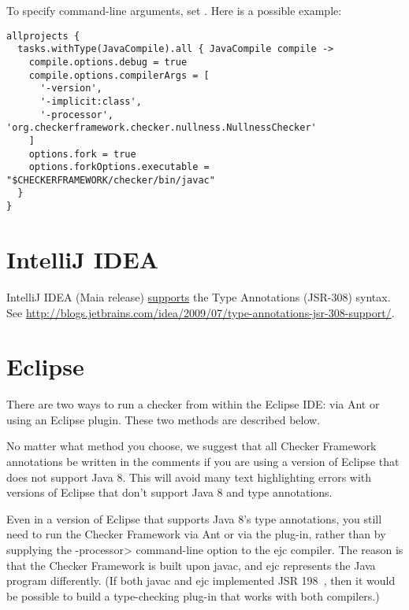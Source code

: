 To specify command-line arguments, set
.  Here is a possible example:

\begin{Verbatim}
allprojects {
  tasks.withType(JavaCompile).all { JavaCompile compile ->
    compile.options.debug = true
    compile.options.compilerArgs = [
      '-version',
      '-implicit:class',
      '-processor', 'org.checkerframework.checker.nullness.NullnessChecker'
    ]
    options.fork = true
    options.forkOptions.executable = "$CHECKERFRAMEWORK/checker/bin/javac"
  }
}
\end{Verbatim}



\section{IntelliJ IDEA\label{intellij}}

IntelliJ IDEA (Maia release)
\href{http://blogs.jetbrains.com/idea/2009/07/type-annotations-jsr-308-support/}{supports}
the Type Annotations (JSR-308) syntax.
See \url{http://blogs.jetbrains.com/idea/2009/07/type-annotations-jsr-308-support/}.

\section{Eclipse\label{eclipse}}


There are two ways to run a checker from within the Eclipse IDE:  via Ant
or using an Eclipse plugin.  These two methods are described below.

No matter what method you choose, we suggest that
all Checker Framework annotations be written in the comments
if you are using a version of Eclipse that
does not support Java 8.  This will avoid many
text highlighting errors with versions of Eclipse that don't support Java 8
and type annotations.

Even in a version of Eclipse that supports Java 8's type annotations, you
still need to run the Checker Framework via Ant or via the plug-in, rather
than by supplying the \<-processor> command-line option to the ejc
compiler.  The reason is that the Checker Framework is built upon javac,
and ejc represents the Java program differently.  (If both javac and ejc
implemented JSR 198~\cite{JSR198}, then it would be possible to build
a type-checking plug-in that works with both compilers.)


